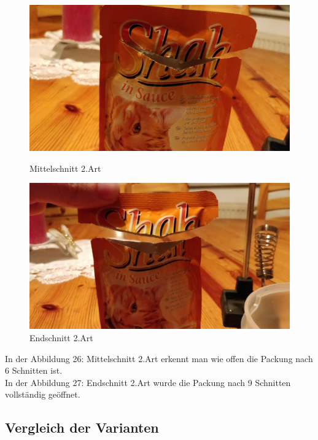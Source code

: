 \documentclass[a4paper,12pt]{scrartcl}
\begin{document}
\begin{figure}[H]
   \begin{minipage}[hbt]{.4\linewidth} %
      \includegraphics[width=\linewidth]{Bilder/Schneideversuch_2.Art/Mittelschnitt}
      \caption{Mittelschnitt 2.Art}
      \label{Nach 6 Schnitten}
   \end{minipage}
   \hspace{.2\linewidth}%
   \begin{minipage}[hbt]{.4\linewidth} %
      \includegraphics[width=\linewidth]{Bilder/Schneideversuch_2.Art/Endschnitt}
      \caption{Endschnitt 2.Art}
      \label{Nach 9 Schnitten}
   \end{minipage}
\end{figure}
In der Abbildung 26: Mittelschnitt 2.Art erkennt man wie offen die Packung nach 6 Schnitten ist.\\

In der Abbildung 27: Endschnitt 2.Art wurde die Packung nach 9 Schnitten vollständig geöffnet.

\subsection{Vergleich der Varianten}
\end{document}
